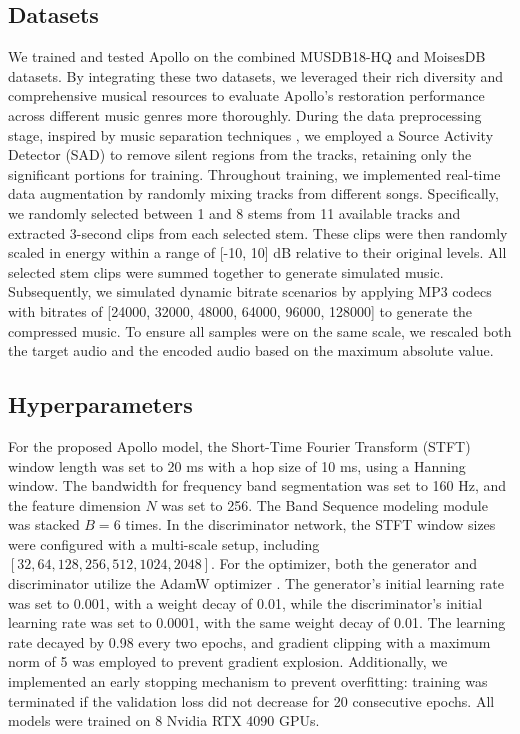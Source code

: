 \subsection{Datasets}
We trained and tested Apollo on the combined MUSDB18-HQ \cite{rafii2019musdb18} and MoisesDB \cite{pereira2023moisesdb} datasets. By integrating these two datasets, we leveraged their rich diversity and comprehensive musical resources to evaluate Apollo's restoration performance across different music genres more thoroughly. During the data preprocessing stage, inspired by music separation techniques \cite{uhlich2024sound,li2024subnetwork}, we employed a Source Activity Detector (SAD) to remove silent regions from the tracks, retaining only the significant portions for training. Throughout training, we implemented real-time data augmentation by randomly mixing tracks from different songs. Specifically, we randomly selected between 1 and 8 stems from 11 available tracks and extracted 3-second clips from each selected stem. These clips were then randomly scaled in energy within a range of [-10, 10] dB relative to their original levels. All selected stem clips were summed together to generate simulated music. Subsequently, we simulated dynamic bitrate scenarios by applying MP3 codecs with bitrates of [24000, 32000, 48000, 64000, 96000, 128000] to generate the compressed music. To ensure all samples were on the same scale, we rescaled both the target audio and the encoded audio based on the maximum absolute value.

\subsection{Hyperparameters}
For the proposed Apollo model, the Short-Time Fourier Transform (STFT) window length was set to 20 ms with a hop size of 10 ms, using a Hanning window. The bandwidth for frequency band segmentation was set to 160 Hz, and the feature dimension $N$ was set to 256. The Band Sequence modeling module was stacked $B = 6$ times. In the discriminator network, the STFT window sizes were configured with a multi-scale setup, including $[32, 64, 128, 256, 512, 1024, 2048]$. For the optimizer, both the generator and discriminator utilize the AdamW optimizer \cite{loshchilov2017decoupled}. The generator's initial learning rate was set to 0.001, with a weight decay of 0.01, while the discriminator's initial learning rate was set to 0.0001, with the same weight decay of 0.01. The learning rate decayed by 0.98 every two epochs, and gradient clipping with a maximum norm of 5 was employed to prevent gradient explosion. Additionally, we implemented an early stopping mechanism to prevent overfitting: training was terminated if the validation loss did not decrease for 20 consecutive epochs. All models were trained on 8 Nvidia RTX 4090 GPUs.

